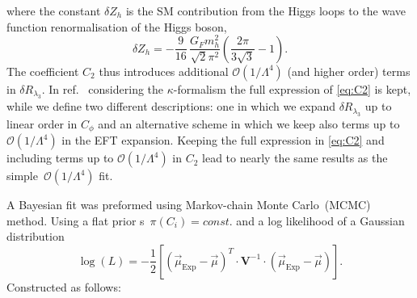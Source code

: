 %
where the constant $\delta Z_h$ is the SM contribution from the Higgs loops to the wave function renormalisation of the Higgs boson,
\begin{equation}
	\delta Z_h =-\frac{9}{16}\,\frac{G_F m_h^2}{\sqrt{2}\pi^2}\left(\frac{2\pi}{3\sqrt{3}}-1\right).
\end{equation}
The coefficient $C_2$ thus introduces additional $\mathcal{O}(1/\Lambda^4)$ (and higher order) terms in $\delta R_{\lambda_3}$.  
In ref.~\cite{Degrassi:2016wml} considering the $\kappa$-formalism the full expression of \eqref{eq:C2} is kept, while we define two different descriptions: one in which we expand $\delta R_{\lambda_3}$ up to linear order in $C_\phi$ and an alternative scheme in which we keep also terms up to $\mathcal{O}(1/\Lambda^4)$ in the EFT expansion. Keeping the full expression in \eqref{eq:C2} and including terms up to $\mathcal{O}(1/\Lambda^4)$  in $C_2$ lead to nearly the same results as the simple~$\mathcal{O}(1/\Lambda^4)$ fit.

%
A Bayesian fit was preformed using Markov-chain Monte Carlo~(MCMC) method.   Using a flat prior s~$ \pi(C_i)= const.$ and a log likelihood of a Gaussian distribution 
\begin{equation}
	\log(L) = -\frac{1}{2}\left[  (\vec{\mu}_{\mathrm{Exp}} -\vec{\mu} ) ^{T} \cdot \mathbf{V}^{-1} \cdot ( \vec{\mu}_{\mathrm{Exp}} -\vec{\mu} )\right]  .
	\label{eq:loglike}
\end{equation}
Constructed as follows:

